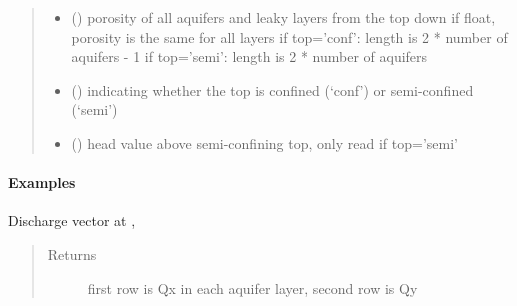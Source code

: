 \documentclass[letterpaper,10pt,english]{sphinxmanual}
\begin{document}
\begin{fulllineitems}
\begin{quote}
\begin{description}
\begin{itemize}
\item {} 
 (\sphinxstyleliteralemphasis{, }) \textendash{} porosity of all aquifers and leaky layers from the top down
if float, porosity is the same for all layers
if top=’conf’: length is 2 * number of aquifers - 1
if top=’semi’: length is 2 * number of aquifers

\item {} 
 (\sphinxstyleliteralemphasis{, }\sphinxstyleliteralemphasis{ (}\sphinxstyleliteralemphasis{)}) \textendash{} indicating whether the top is confined (‘conf’) or
semi-confined (‘semi’)

\item {} 
 (\sphinxstyleliteralemphasis{ (}\sphinxstyleliteralemphasis{)}) \textendash{} head value above semi-confining top, only read if top=’semi’

\end{itemize}

\end{description}\end{quote}
\paragraph{Examples}

\begin{sphinxVerbatim}[commandchars=\\\{\}]
  \PYG{p}{[} \PYG{p}{]} \PYG{p}{[}   \PYG{p}{]} 
\end{sphinxVerbatim}

\begin{fulllineitems}
\label{\detokenize{models/modelmaq:timml.model.ModelMaq.disvec}}
Discharge vector at , 
\begin{quote}\begin{description}
\item[{Returns}] \leavevmode
{} \textendash{} first row is Qx in each aquifer layer, second row is Qy


\end{description}
\end{quote}
\end{fulllineitems}
\end{fulllineitems}
\end{document}
